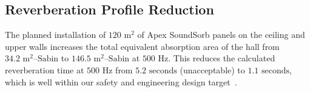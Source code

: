 \subsection{Reverberation Profile Reduction}
The planned installation of $120\text{~m}^2$ of Apex SoundSorb panels on the ceiling and upper walls increases the total equivalent absorption area of the hall from $34.2\text{~m}^2\text{--Sabin}$ to $146.5\text{~m}^2\text{--Sabin}$ at $500\text{~Hz}$. This reduces the calculated reverberation time at $500\text{~Hz}$ from $5.2\text{~seconds}$ (unacceptable) to $1.1\text{~seconds}$, which is well within our safety and engineering design target~\cite{Kuttruff2009}.
